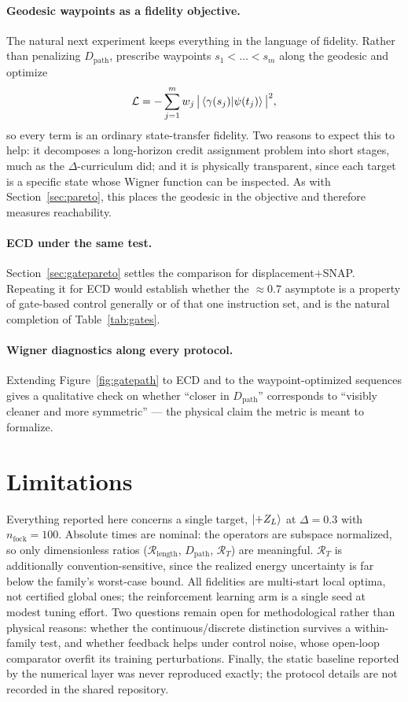 \documentclass[10pt]{article}
\newcommand{\Dpath}{D_{\mathrm{path}}}
\newcommand{\Rlen}{\mathcal{R}_{\mathrm{length}}}
\newcommand{\zL}{\ket{{+}Z_L}}
\begin{document}
\paragraph{Geodesic waypoints as a fidelity objective.} The natural next
experiment keeps everything in the language of fidelity. Rather than penalizing
$\Dpath$, prescribe waypoints $s_1<\dots<s_m$ along the geodesic and optimize
\begin{equation}
\mathcal{L} = -\sum_{j=1}^{m} w_j \,\big|\braket{\gamma(s_j)|\psi(t_j)}\big|^2 ,
\label{eq:waypoints}
\end{equation}
so every term is an ordinary state-transfer fidelity. Two reasons to expect this
to help: it decomposes a long-horizon credit assignment problem into short stages,
much as the $\Delta$-curriculum did; and it is physically transparent, since each
target is a specific state whose Wigner function can be inspected. As with
Section~\ref{sec:pareto}, this places the geodesic in the objective and therefore
measures reachability.

\paragraph{ECD under the same test.} Section~\ref{sec:gatepareto} settles the
comparison for displacement$+$SNAP. Repeating it for ECD would establish whether
the $\approx0.7$ asymptote is a property of gate-based control generally or of
that one instruction set, and is the natural completion of Table~\ref{tab:gates}.

\paragraph{Wigner diagnostics along every protocol.} Extending
Figure~\ref{fig:gatepath} to ECD and to the waypoint-optimized sequences gives a
qualitative check on whether ``closer in $\Dpath$'' corresponds to
``visibly cleaner and more symmetric'' --- the physical claim the metric is meant
to formalize.

\section{Limitations}

Everything reported here concerns a single target, $\zL$ at $\Delta=0.3$ with
$n_{\mathrm{fock}}=100$. Absolute times are nominal: the operators are subspace
normalized, so only dimensionless ratios ($\Rlen$, $\Dpath$, $\mathcal{R}_T$) are
meaningful. $\mathcal{R}_T$ is additionally convention-sensitive, since the
realized energy uncertainty is far below the family's worst-case bound. All
fidelities are multi-start local optima, not certified global ones; the reinforcement
learning arm is a single seed at modest tuning effort. Two questions remain open
for methodological rather than physical reasons: whether the continuous/discrete
distinction survives a within-family test, and whether feedback helps under control
noise, whose open-loop comparator overfit its training perturbations. Finally, the
static baseline reported by the numerical layer was never reproduced exactly; the
protocol details are not recorded in the shared repository.
\end{document}

